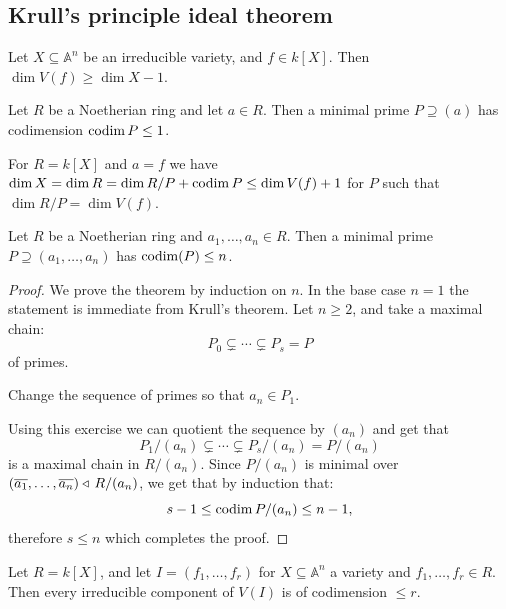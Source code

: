 \documentclass[11pt,a4paper]{article}
\newcommand{\A}{\mathbb A}
\begin{document}
\subsection{Krull's principle ideal theorem}

\begin{theorem}
  Let $X \subseteq \A^n$ be an irreducible variety,
  and $f \in k[X]$.
  Then $\dim V(f) \geq \dim X - 1$.
\end{theorem}

\begin{theorem}
  \label{thm:krull-pit-algebraic}
  Let $R$ be a Noetherian ring and let $a \in R$.
  Then a minimal prime $P \supseteq (a)$ has codimension $\operatorname{codim} P \le 1$.
\end{theorem}

\begin{remark}
  For $R = k[X]$ and $a = f$ we have $\dim X = \dim R = \dim R/P + \operatorname{codim} P
  \le \dim V(f) + 1$ for $P$ such that $\dim R/P = \dim V(f)$.
\end{remark}

\begin{corollary}
  Let $R$ be a Noetherian ring and $a_1,\dots,a_n \in R$.
  Then a minimal prime $P \supseteq (a_1,\dots,a_n)$ has
  $\operatorname{codim} (P) \le n$.
\end{corollary}
\begin{proof}
  We prove the theorem by induction on $n$.
  In the base case $n = 1$ the statement is immediate from Krull's theorem.
  Let $n \geq 2$, and take a maximal chain:
  \[
    P_0 \subsetneq \cdots \subsetneq P_s = P
  \]
  of primes.
  \begin{exercise}
    Change the sequence of primes so that $a_n \in P_1$.
  \end{exercise}
  Using this exercise we can quotient the sequence by $(a_n)$ and get that
  \[
    P_1 / (a_n) \subsetneq \cdots \subsetneq P_s / (a_n) = P / (a_n)
  \]
  is a maximal chain in $R / (a_n)$.
  Since $P / (a_n)$ is minimal over
  $(\overline{a_1},\dots,\overline{a_n}) \triangleleft\, R/(a_n)$,
  we get that by induction that:
  \[
    s - 1 \le \operatorname{codim} P / (a_n) \le n - 1,
  \]
  therefore $s \le n$ which completes the proof.
\end{proof}

\begin{corollary}
  Let $R = k[X]$,
  and let $I = (f_1,\dots,f_r)$ for $X \subseteq \A^n$ a variety
  and $f_1,\dots,f_r \in R$.
  Then every irreducible component of $V(I)$ is of codimension $\le r$.
\end{corollary}
\end{document}
